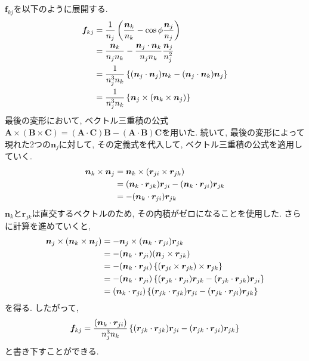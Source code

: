 $\bm{f}_{kj}$を以下のように展開する. 
\begin{align}
    \bm{f}_{kj}
 &=
    \frac{1}{n_j}
    \left(
           \frac{\bm{n}_{k}}{n_{k}} - \cos\phi \frac{\bm{n}_{j}}{n_{j}}
    \right)
 \notag
 \\
 &=
    \frac{\bm{n}_{k}}{n_{j}n_{k}}
   -\frac{\bm{n}_{j} \cdot \bm{n}_{k}}{n_{j}n_{k}}
    \frac{\bm{n}_{j}}{n_{j}^{2}}
 \notag
 \\
 &=
    \frac{1}{n_{j}^{3}n_{k}}
    \left\{
            (\bm{n}_{j} \cdot \bm{n}_{j}) \bm{n}_{k}
           -(\bm{n}_{j} \cdot \bm{n}_{k}) \bm{n}_{j}
    \right\}
 \notag
 \\
 &=
    \frac{1}{n_{j}^{3}n_{k}}
    \left\{
            \bm{n}_{j} \times (\bm{n}_{k} \times \bm{n}_{j})
    \right\}
 \notag
\end{align}
最後の変形において, ベクトル三重積の公式
$\bm{A} \times (\bm{B} \times \bm{C}) = (\bm{A} \cdot \bm{C})\bm{B}
 - (\bm{A} \cdot \bm{B})\bm{C}$を用いた.
続いて, 最後の変形によって現れた2つの$\bm{n}_{j}$に対して, 
その定義式を代入して, ベクトル三重積の公式を適用していく. 
\begin{align}
    \bm{n}_{k} \times \bm{n}_{j}
 &=
    \bm{n}_{k} \times (\bm{r}_{ji} \times \bm{r}_{jk})
 \notag
 \\
 &=
    (\bm{n}_{k} \cdot \bm{r}_{jk}) \bm{r}_{ji}
   -(\bm{n}_{k} \cdot \bm{r}_{ji}) \bm{r}_{jk}
 \notag
 \\
 &=
   -(\bm{n}_{k} \cdot \bm{r}_{ji}) \bm{r}_{jk}
 \notag
\end{align}
$\bm{n}_{k}$と$\bm{r}_{jk}$は直交するベクトルのため, その内積がゼロになることを使用した. 
さらに計算を進めていくと, 
\begin{align}
    \bm{n}_{j} \times (\bm{n}_{k} \times \bm{n}_{j})
 &=
   -\bm{n}_{j} \times (\bm{n}_{k} \cdot \bm{r}_{ji}) \bm{r}_{jk}
 \notag
 \\
 &=
   -(\bm{n}_{k} \cdot \bm{r}_{ji})
    (\bm{n}_{j} \times \bm{r}_{jk})
 \notag
 \\
 &=
   -(\bm{n}_{k} \cdot \bm{r}_{ji})
   \left\{
          (\bm{r}_{ji} \times \bm{r}_{jk}) \times \bm{r}_{jk}
   \right\}
 \notag
 \\
 &=
   -(\bm{n}_{k} \cdot \bm{r}_{ji})
   \left\{
           (\bm{r}_{jk} \cdot \bm{r}_{ji}) \bm{r}_{jk}
          -(\bm{r}_{jk} \cdot \bm{r}_{jk}) \bm{r}_{ji}
   \right\}
 \notag
 \\
 &=
   (\bm{n}_{k} \cdot \bm{r}_{ji})
   \left\{
           (\bm{r}_{jk} \cdot \bm{r}_{jk}) \bm{r}_{ji}
          -(\bm{r}_{jk} \cdot \bm{r}_{ji}) \bm{r}_{jk}
   \right\}
   \notag
\end{align}
を得る. したがって, 
\begin{align}
  \bm{f}_{kj}
 =
  \frac{(\bm{n}_{k} \cdot \bm{r}_{ji})}{n_{j}^{3}n_{k}}
  \left\{
          (\bm{r}_{jk} \cdot \bm{r}_{jk}) \bm{r}_{ji}
         -(\bm{r}_{jk} \cdot \bm{r}_{ji}) \bm{r}_{jk}
  \right\}
  \notag
\end{align}
と書き下すことができる. 
\\

